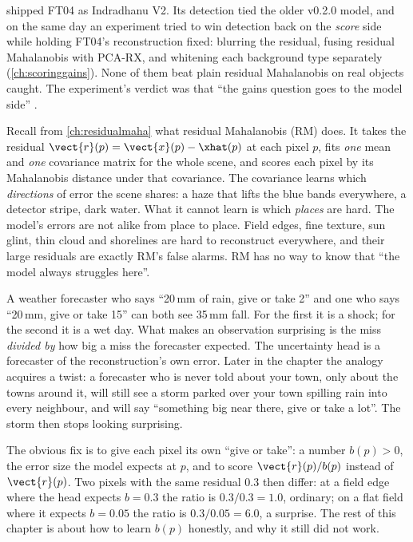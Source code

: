  shipped FT04 as Indradhanu V2. Its detection tied the older v0.2.0 model, and on the same
day an experiment tried to win detection back on the \emph{score} side while holding FT04's reconstruction
fixed: blurring the residual, fusing residual Mahalanobis with PCA-RX, and whitening each background type
separately (\cref{ch:scoringgains}). None of them beat plain residual Mahalanobis on real objects caught. The
experiment's verdict was that ``the gains question goes to the model side''
.

Recall from \cref{ch:residualmaha} what residual Mahalanobis (RM) does. It takes the residual
$\vect{r}(p)=\vect{x}(p)-\xhat(p)$ at each pixel $p$, fits \emph{one} mean and \emph{one} covariance matrix for
the whole scene, and scores each pixel by its Mahalanobis distance under that covariance. The covariance
learns which \emph{directions} of error the scene shares: a haze that lifts the blue bands everywhere, a
detector stripe, dark water. What it cannot learn is which \emph{places} are hard. The model's errors are not
alike from place to place. Field edges, fine texture, sun glint, thin cloud and shorelines are hard to
reconstruct everywhere, and their large residuals are exactly RM's false alarms. RM has no way to know that
``the model always struggles here''.

\begin{analogy}
A weather forecaster who says ``20\,mm of rain, give or take 2'' and one who says ``20\,mm, give or take 15''
can both see 35\,mm fall. For the first it is a shock; for the second it is a wet day. What makes an
observation surprising is the miss \emph{divided by} how big a miss the forecaster expected. The uncertainty
head is a forecaster of the reconstruction's own error. Later in the chapter the analogy acquires a twist:
a forecaster who is never told about your town, only about the towns around it, will still see a storm
parked over your town spilling rain into every neighbour, and will say ``something big near there, give or
take a lot''. The storm then stops looking surprising.
\end{analogy}

The obvious fix is to give each pixel its own ``give or take'': a number $b(p)>0$, the error size the model
expects at $p$, and to score $\vect{r}(p)/b(p)$ instead of $\vect{r}(p)$. Two pixels with the same residual
$0.3$ then differ: at a field edge where the head expects $b=0.3$ the ratio is $0.3/0.3=1.0$, ordinary; on a
flat field where it expects $b=0.05$ the ratio is $0.3/0.05=6.0$, a surprise. The rest of this chapter is about
how to learn $b(p)$ honestly, and why it still did not work.

